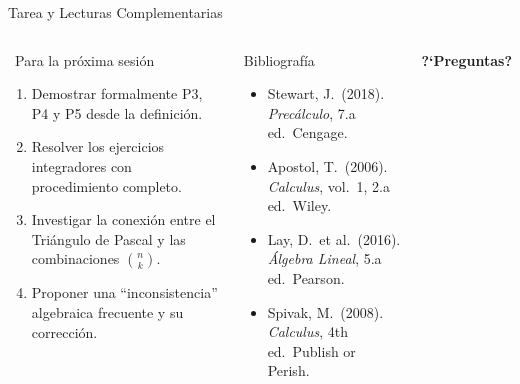 \documentclass[12pt,aspectratio=169]{beamer}
\begin{document}
\begin{frame}{Tarea y Lecturas Complementarias}
  \begin{columns}[T]
    \begin{block}{\ Para la pr\'oxima sesi\'on}
      \small
      \begin{enumerate}
        \item Demostrar formalmente P3, P4 y P5 desde la definici\'on.
        \item Resolver los ejercicios integradores con procedimiento
              completo.
        \item Investigar la conexi\'on entre el Tri\'angulo de Pascal
              y las combinaciones $\binom{n}{k}$.
        \item Proponer una ``inconsistencia'' algebraica frecuente
              y su correcci\'on.
      \end{enumerate}
    \end{block}

    \begin{block}{Bibliograf\'ia}
      \small
      \begin{itemize}
        \item Stewart, J.\ (2018). \textit{Prec\'alculo}, 7.a ed.\
              Cengage.
        \item Apostol, T.\ (2006). \textit{Calculus}, vol.\ 1,
              2.a ed.\ Wiley.
        \item Lay, D.\ et al.\ (2016). \textit{\'Algebra Lineal},
              5.a ed.\ Pearson.
        \item Spivak, M.\ (2008). \textit{Calculus}, 4th ed.\
              Publish or Perish.
      \end{itemize}
    \end{block}
    \vspace{5pt}
    \begin{center}
      \large\textbf{\color{azul}?`Preguntas?}
    \end{center}
  \end{columns}
\end{frame}
\end{document}

